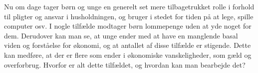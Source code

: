 Nu om dage tager børn og unge en generelt set mere tilbagetrukket rolle i forhold til pligter og ansvar i husholdningen, og bruger i stedet for tiden på at lege, spille computer osv\cite{Boerneliv}. I nogle tilfælde modtager børn lommepenge uden at yde noget for dem. Derudover kan man se, at unge ender med at have en manglende basal viden og forståelse for økonomi, og at antallet af disse tilfælde er stigende\cite{BusinessDK2}. Dette kan medføre, at der er flere som ender i økonomiske vanskeligheder, som gæld og overforbrug. Hvorfor er alt dette tilfældet, og hvordan kan man bearbejde det?